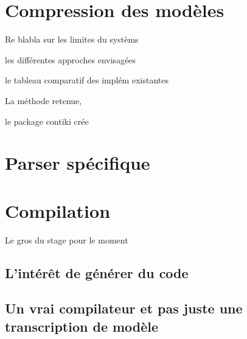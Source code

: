 \section{Compression des modèles}

Re blabla sur les limites du systèms

les différentes approches envisagées 

le tableau comparatif des implém existantes

La méthode retenue,

le package contiki crée


\section{Parser spécifique}

\section{Compilation}

Le gros du stage pour le moment

\subsection{L'intérêt de générer du code}

\subsection{Un vrai compilateur et pas juste une transcription de modèle}